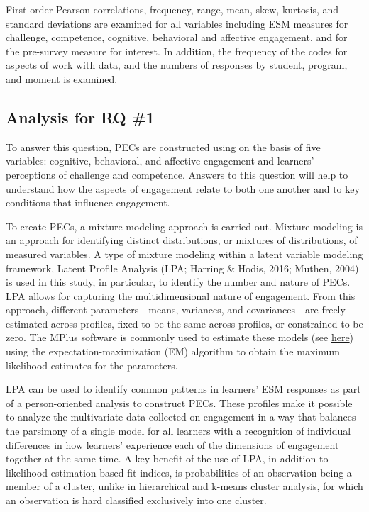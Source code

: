 \documentclass[]{msu-thesis}
\theoremstyle{definition}
\theoremstyle{definition}
\theoremstyle{definition}
\theoremstyle{remark}
\begin{document}
First-order Pearson correlations, frequency, range, mean, skew,
kurtosis, and standard deviations are examined for all variables
including ESM measures for challenge, competence, cognitive, behavioral
and affective engagement, and for the pre-survey measure for interest.
In addition, the frequency of the codes for aspects of work with data,
and the numbers of responses by student, program, and moment is
examined.

\subsection{Analysis for RQ \#1}\label{analysis-for-rq-1}

To answer this question, PECs are constructed using on the basis of five
variables: cognitive, behavioral, and affective engagement and learners'
perceptions of challenge and competence. Answers to this question will
help to understand how the aspects of engagement relate to both one
another and to key conditions that influence engagement.

To create PECs, a mixture modeling approach is carried out. Mixture
modeling is an approach for identifying distinct distributions, or
mixtures of distributions, of measured variables. A type of mixture
modeling within a latent variable modeling framework, Latent Profile
Analysis (LPA; Harring \& Hodis, 2016; Muthen, 2004) is used in this
study, in particular, to identify the number and nature of PECs. LPA
allows for capturing the multidimensional nature of engagement. From
this approach, different parameters - means, variances, and covariances
- are freely estimated across profiles, fixed to be the same across
profiles, or constrained to be zero. The MPlus software is commonly used
to estimate these models (see
\href{https://www.statmodel.com/examples/mixture.shtml}{here}) using the
expectation-maximization (EM) algorithm to obtain the maximum likelihood
estimates for the parameters.

LPA can be used to identify common patterns in learners' ESM responses
as part of a person-oriented analysis to construct PECs. These profiles
make it possible to analyze the multivariate data collected on
engagement in a way that balances the parsimony of a single model for
all learners with a recognition of individual differences in how
learners' experience each of the dimensions of engagement together at
the same time. A key benefit of the use of LPA, in addition to
likelihood estimation-based fit indices, is probabilities of an
observation being a member of a cluster, unlike in hierarchical and
k-means cluster analysis, for which an observation is hard classified
exclusively into one cluster.
\end{document}
